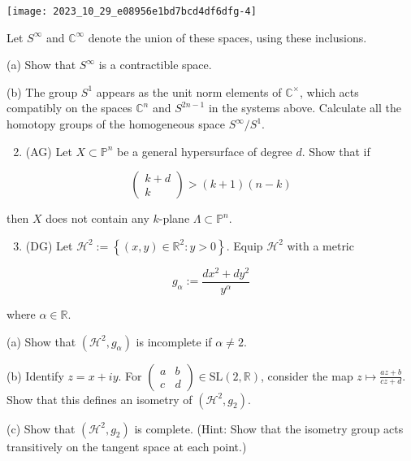 \documentclass[10pt]{article}
\begin{document}
\begin{center}
\texttt{[image: 2023\_10\_29\_e08956e1bd7bcd4df6dfg-4]}
\end{center}

Let $S^{\infty}$ and $\mathbb{C}^{\infty}$ denote the union of these spaces, using these inclusions.

(a) Show that $S^{\infty}$ is a contractible space.

(b) The group $S^{1}$ appears as the unit norm elements of $\mathbb{C}^{\times}$, which acts compatibly on the spaces $\mathbb{C}^{n}$ and $S^{2 n-1}$ in the systems above. Calculate all the homotopy groups of the homogeneous space $S^{\infty} / S^{1}$.

\begin{enumerate}
  \setcounter{enumi}{1}
  \item (AG) Let $X \subset \mathbb{P}^{n}$ be a general hypersurface of degree $d$. Show that if
\end{enumerate}

$$
\left(\begin{array}{c}
k+d \\
k
\end{array}\right)>(k+1)(n-k)
$$

then $X$ does not contain any $k$-plane $\Lambda \subset \mathbb{P}^{n}$.

\begin{enumerate}
  \setcounter{enumi}{2}
  \item (DG) Let $\mathcal{H}^{2}:=\left\{(x, y) \in \mathbb{R}^{2}: y>0\right\}$. Equip $\mathcal{H}^{2}$ with a metric
\end{enumerate}

$$
g_{\alpha}:=\frac{d x^{2}+d y^{2}}{y^{\alpha}}
$$

where $\alpha \in \mathbb{R}$.

(a) Show that $\left(\mathcal{H}^{2}, g_{\alpha}\right)$ is incomplete if $\alpha \neq 2$.

(b) Identify $z=x+i y$. For $\left(\begin{array}{ll}a & b \\ c & d\end{array}\right) \in \mathrm{SL}(2, \mathbb{R})$, consider the map $z \mapsto \frac{a z+b}{c z+d}$. Show that this defines an isometry of $\left(\mathcal{H}^{2}, g_{2}\right)$.

(c) Show that $\left(\mathcal{H}^{2}, g_{2}\right)$ is complete. (Hint: Show that the isometry group acts transitively on the tangent space at each point.)
\end{document}
